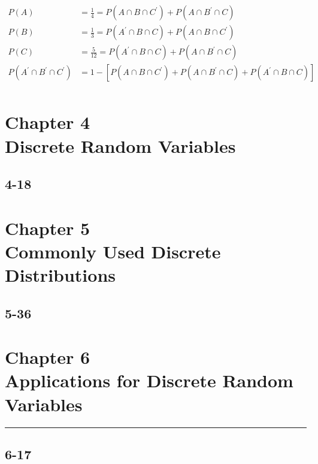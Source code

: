 \documentclass{article}
\begin{document}
			\begin{align*}
				P(A) &= \frac{1}{4} = P(A \cap B \cap C^\prime) + P(A \cap B^\prime \cap C) \\
				P(B) &= \frac{1}{3} = P(A^\prime \cap B \cap C) + P(A \cap B \cap C^\prime) \\
				P(C) &= \frac{5}{12} = P(A^\prime \cap B \cap C) + P(A \cap B^\prime \cap C) \\
				P(A^\prime \cap B^\prime \cap C^\prime) &= 1 - \left[ P(A \cap B \cap C^\prime) + P(A \cap B^\prime \cap C) + P(A^\prime \cap B \cap C) \right] \\
 			\end{align*}



	\section[Chapter 4: Discrete Random Variables]{Chapter 4 \\
		Discrete Random Variables}

		\subsection*{4-18}

	\clearpage

	\section[Chapter 5: Commonly Used Discrete Distributions]{Chapter 5 \\
		Commonly Used Discrete Distributions}

		\subsection*{5-36}

	\clearpage

	\section[Chapter 6: Applications for Discrete Random Variables]{Chapter 6 \\
		Applications for Discrete Random Variables}
	\vspace{-0.2cm}
	\hrule
	\vspace{0.5cm}
		\subsection*{6-17}
\end{document}
